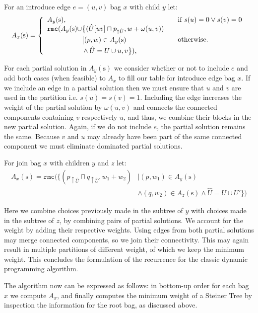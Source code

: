 \documentclass{llncs}
\begin{document}
 For an introduce edge $e = (u,v)$ bag $x$ with child $y$ let:
\[
A_{x}(\mathrm{s})= \left\{ \begin{array}{l l} 
A_{y}(\mathrm{s}), & \quad \mbox{if } s(u) = 0 \vee s(v) = 0 \\
\begin{split}
\texttt{rmc}(A_{y}(\mathrm{s}) \cup &\big\{ (\hat{U}[uv] \sqcap p_{\uparrow \hat{U}},w+\omega(u,v)) \\
& \big| (p, w) \in A_{y}(\mathrm{s}) \\
& \wedge \hat{U} = U\cup{u,v} \big\} ), 
\end{split}
& \quad \mbox{otherwise.} \\
\end{array} \right.
\]

For each partial solution in $A_{y}(\mathrm{s})$ we consider whether or not to include $e$ and add both cases (when feasible) to $A_{x}$ to fill our table for introduce edge bag $x$. If we include an edge in a partial solution then we must ensure that $u$ and $v$ are used in the partition i.e. $s(u) = s(v) = 1$. Including the edge increases the weight of the partial solution by $\omega(u,v)$ and connects the connected components containing $v$ respectively $u$,
and thus, we combine their blocks in the new partial solution. Again, if we do not include $e$, the partial solution remains the same. Because $v$ and $u$ may already have been part of the same connected component we must eliminate dominated partial solutions.

For join bag $x$ with children $y$ and $z$ let:
\[
\begin{split}
A_{x}(\mathrm{s}) = \texttt{rmc}(\Big\{ (p_{\uparrow\hat{U}}\sqcap q_{\uparrow\hat{U}}, w_{1} + w_{2}) &\Big| (p, w_{1}) \in A_{y}(\mathrm{s}) \\
&\wedge (q, w_{2}) \in A_{z}(\mathrm{s}) \wedge \hat{U} = U \cup U'     \Big\})
\end{split}
\]

Here we combine choices previously made in the subtree of $y$ with choices made in the subtree of $z$, by combining pairs of partial solutions. We account for the weight by adding their respective weights. Using edges from both partial solutions may merge connected components, so we join their connectivity. This may again result in multiple partitions of different weight, of which
we keep the minimum weight. This concludes the formulation of the recurrence for the classic dynamic programming algorithm.

The algorithm now can be expressed as follows: in bottom-up order for each bag $x$ we compute $A_x$,
and finally computes the minimum weight of a Steiner Tree by inspection the information for the root bag, as discussed above.
\end{document}
